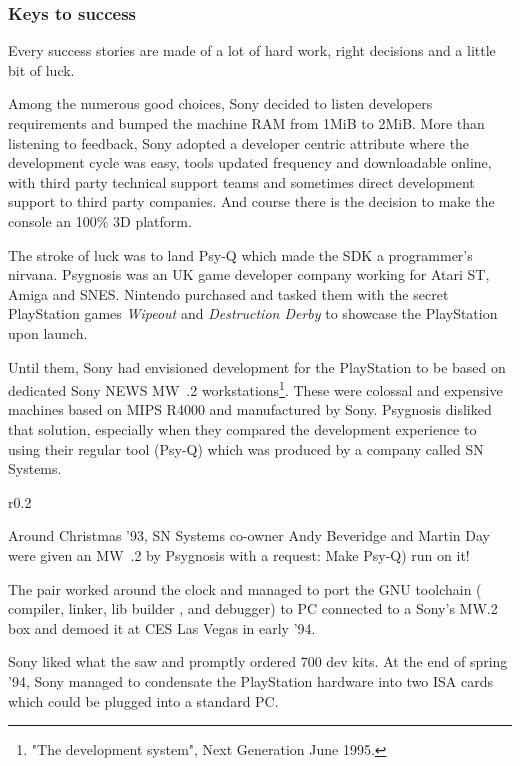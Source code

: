 \subsubsection{Keys to success}
Every success stories are made of a lot of hard work, right decisions and a little bit of luck.\\
\par
 Among the numerous good choices, Sony decided to listen developers requirements and bumped the machine RAM from 1MiB to 2MiB. More than listening to feedback, Sony adopted a developer centric attribute where the development cycle was easy, tools updated frequency and downloadable online, with third party technical support teams and sometimes direct development support to third party companies. And course there is the decision to make the console an 100\% 3D platform.\\
\par
The stroke of luck was to land Psy-Q which made the SDK a programmer's nirvana. Psygnosis was an UK game developer company working for Atari ST, Amiga and SNES. Nintendo purchased and tasked them with the secret PlayStation games \textit{Wipeout} and \textit{Destruction Derby} to showcase the PlayStation upon launch.\\
\par
Until them, Sony had envisioned development for the PlayStation to be based on dedicated Sony NEWS MW~.2 workstations\footnote{"The development system", Next Generation June 1995.}. These were colossal and expensive machines based on MIPS R4000 and manufactured by Sony. Psygnosis disliked that solution, especially when they compared the development experience to using their regular tool (Psy-Q) which was produced by a company called SN Systems.\\
\par
\begin{wrapfigure}[10]{r}{0.2\textwidth}{
\centering {}}
\end{wrapfigure}
Around Christmas '93, SN Systems co-owner Andy Beveridge and Martin Day were given an MW~.2 by Psygnosis with a request: Make Psy-Q) run on it!\\
\par
 The pair worked around the clock and managed to port the GNU toolchain ( compiler,  linker, lib builder , and  debugger) to PC connected to a Sony's MW.2 box and demoed it at CES Las Vegas in early '94.\\
\par
 Sony liked what the saw and promptly ordered 700 dev kits. At the end of spring '94, Sony managed to condensate the PlayStation hardware into two ISA cards which could be plugged into a standard PC.\\

